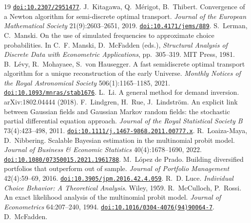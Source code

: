 \documentclass[11pt]{article}
\begin{document}
\begin{thebibliography}{19}
\href{https://doi.org/10.2307/2951477}{\nolinkurl{doi:10.2307/2951477}}.
 J.~Kitagawa, Q.~M\'erigot, B.~Thibert.
Convergence of a Newton algorithm for semi-discrete optimal transport.
\emph{Journal of the European Mathematical Society} 21(9):2603--2651,
2019.
\href{https://doi.org/10.4171/jems/889}{\nolinkurl{doi:10.4171/jems/889}}.
 S.~Lerman, C.~Manski.
On the use of simulated frequencies to approximate choice probabilities.
In C.~F. Manski, D.~McFadden (eds.), \emph{Structural Analysis of
Discrete Data with Econometric Applications}, pp.~305--319. MIT Press, 1981.
 B.~L\'evy, R.~Mohayaee, S.~von Hausegger. A fast
semidiscrete optimal transport algorithm for a unique reconstruction of
the early Universe. \emph{Monthly Notices of the Royal Astronomical
Society} 506(1):1165--1185, 2021.
\href{https://doi.org/10.1093/mnras/stab1676}{\nolinkurl{doi:10.1093/mnras/stab1676}}.
 L.~Li. A general method for demand
inversion. arXiv:1802.04444 (2018).
 F.~Lindgren, H.~Rue,
J.~Lindstr\"om. An explicit link between Gaussian fields and Gaussian Markov
random fields: the stochastic partial differential equation approach.
\emph{Journal of the Royal Statistical Society B} 73(4):423--498, 2011.
\href{https://doi.org/10.1111/j.1467-9868.2011.00777.x}{\nolinkurl{doi:10.1111/j.1467-9868.2011.00777.x}}.
 R.~Loaiza-Maya,
D.~Nibbering. Scalable Bayesian estimation in the multinomial probit
model. \emph{Journal of Business \& Economic Statistics}
40(4):1678--1690, 2022.
\href{https://doi.org/10.1080/07350015.2021.1961788}{\nolinkurl{doi:10.1080/07350015.2021.1961788}}.
 M.~L\'opez de Prado.
Building diversified portfolios that outperform out of sample.
\emph{Journal of Portfolio Management} 42(4):59--69, 2016.
\href{https://doi.org/10.3905/jpm.2016.42.4.059}{\nolinkurl{doi:10.3905/jpm.2016.42.4.059}}.
 R.~D. Luce. \emph{Individual Choice
Behavior: A Theoretical Analysis}. Wiley, 1959.
 R.~McCulloch, P.~Rossi.
An exact likelihood analysis of the multinomial probit model.
\emph{Journal of Econometrics} 64:207--240, 1994.
\href{https://doi.org/10.1016/0304-4076(94)90064-7}{\nolinkurl{doi:10.1016/0304-4076(94)90064-7}}.
 D.~McFadden.

\end{thebibliography}
\end{document}
